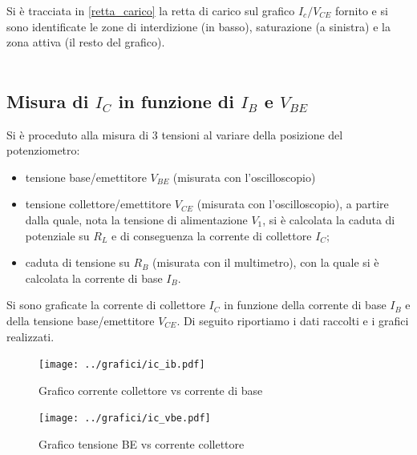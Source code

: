 \documentclass[10pt,a4paper]{article}
\begin{document}
Si è tracciata in \figurename{\ref{retta_carico}} la retta di carico sul grafico $I_c/V_{CE}$ fornito e si sono identificate le zone di interdizione (in basso), saturazione (a sinistra) e la zona attiva (il resto del grafico).
\\\\
\subsection{Misura di $I_C$ in funzione di $I_B$ e $V_{BE}$}
Si è proceduto alla misura di 3 tensioni al variare della posizione del potenziometro:
\begin{itemize}
	\item tensione base/emettitore $V_{BE}$ (misurata con l'oscilloscopio)
	\item tensione collettore/emettitore $V_{CE}$ (misurata con l'oscilloscopio), a partire dalla quale, nota la tensione di alimentazione $V_1$, si è calcolata la caduta di potenziale su $R_L$ e di conseguenza la corrente di collettore $I_C$;
	\item caduta di tensione su $R_B$ (misurata con il multimetro), con la quale si è calcolata la corrente di base $I_B$.
\end{itemize}
Si sono graficate la corrente di collettore $I_C$ in funzione della corrente di base $I_B$ e della tensione base/emettitore $V_{CE}$.
Di seguito riportiamo i dati raccolti e i grafici realizzati.

\begin{figure}[h!]
	\centering
	\begin{minipage}[h!]{0.40\textwidth}
		\centering
		\resizebox{1\textwidth}{!}{
			}
	\end{minipage}
	\begin{minipage}[d]{0.59\textwidth}
		\centering
		\texttt{[image: ../grafici/ic\_ib.pdf]}
		\caption{Grafico corrente collettore vs corrente di base}
		\label{ibic}
		\centering
		\texttt{[image: ../grafici/ic\_vbe.pdf]}
		\caption{Grafico tensione BE vs corrente collettore}
		\label{vbeic}
		\end{minipage}
\end{figure}
\end{document}
